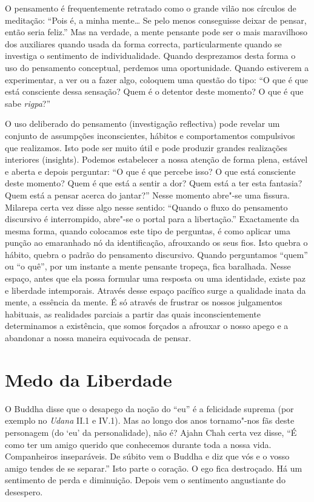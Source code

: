 O pensamento é frequentemente retratado como o grande vilão nos círculos
de meditação: ``Pois é, a minha mente\ldots{} Se pelo menos conseguisse
deixar de pensar, então seria feliz.'' Mas na verdade, a mente pensante
pode ser o mais maravilhoso dos auxiliares quando usada da forma
correcta, particularmente quando se investiga o sentimento de
individualidade. Quando desprezamos desta forma o uso do pensamento
conceptual, perdemos uma oportunidade. Quando estiverem a experimentar,
a ver ou a fazer algo, coloquem uma questão do tipo: ``O que é que está
consciente dessa sensação? Quem é o detentor deste momento? O que é que
sabe \emph{rigpa}?''

O uso deliberado do pensamento (investigação reflectiva) pode revelar um
conjunto de assumpções inconscientes, hábitos e comportamentos
compulsivos que realizamos. Isto pode ser muito útil e pode produzir
grandes realizações interiores (insights). Podemos estabelecer a nossa
atenção de forma plena, estável e aberta e depois perguntar: ``O que é
que percebe isso? O que está consciente deste momento? Quem é que está a
sentir a dor? Quem está a ter esta fantasia? Quem está a pensar acerca
do jantar?'' Nesse momento abre"-se uma fissura. Milarepa certa vez disse
algo nesse sentido: ``Quando o fluxo do pensamento discursivo é
interrompido, abre"-se o portal para a libertação.'' Exactamente da mesma
forma, quando colocamos este tipo de perguntas, é como aplicar uma
punção ao emaranhado nó da identificação, afrouxando os seus fios. Isto
quebra o hábito, quebra o padrão do pensamento discursivo. Quando
perguntamos ``quem'' ou ``o quê'', por um instante a mente pensante
tropeça, fica baralhada. Nesse espaço, antes que ela possa formular uma
resposta ou uma identidade, existe paz e liberdade intemporais. Através
desse espaço pacífico surge a qualidade inata da mente, a essência da
mente. É só através de frustrar os nossos julgamentos habituais, as
realidades parciais a partir das quais inconscientemente determinamos a
existência, que somos forçados a afrouxar o nosso apego e a abandonar a
nossa maneira equivocada de pensar.

\section{Medo da Liberdade}

O Buddha disse que o desapego da noção do ``eu'' é a felicidade suprema
(por exemplo no \emph{Udana} II.1 e IV.1). Mas ao longo dos anos
tornamo"-nos fãs deste personagem (do `eu' da personalidade), não é?
Ajahn Chah certa vez disse, ``É como ter um amigo querido que conhecemos
durante toda a nossa vida. Companheiros inseparáveis. De súbito vem o
Buddha e diz que vós e o vosso amigo tendes de se separar.'' Isto parte
o coração. O ego fica destroçado. Há um sentimento de perda e
diminuição. Depois vem o sentimento angustiante do desespero.

